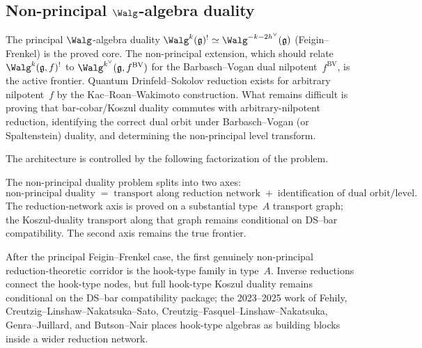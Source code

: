 \subsection{Non-principal \texorpdfstring{$\Walg$}{W}-algebra duality}
\label{subsec:non-principal-w-algebra-duality}

The principal $\Walg$-algebra duality
$\Walg^k(\mathfrak{g})^! \simeq
\Walg^{-k-2h^\vee}(\mathfrak{g})$
(Feigin--Frenkel) is the proved core. The non-principal extension,
which should relate $\Walg^k(\mathfrak{g}, f)^!$ to
$\Walg^{k^\vee}(\mathfrak{g}, f^{\mathrm{BV}})$ for the
Barbasch--Vogan dual nilpotent~$f^{\mathrm{BV}}$, is the active
frontier. Quantum Drinfeld--Sokolov reduction exists for arbitrary
nilpotent~$f$ by the Kac--Roan--Wakimoto construction. What remains
difficult is proving that bar-cobar/Koszul duality commutes with
arbitrary-nilpotent reduction, identifying the correct dual orbit
under Barbasch--Vogan (or Spaltenstein) duality, and determining the
non-principal level transform.

The architecture is controlled by the following factorization of the
problem.

\begin{remark}
\label{rem:transport-orbit-factorization}
The non-principal duality problem splits into two axes:
\[
\text{non-principal duality}
\;=\;
\text{transport along reduction network}
\;+\;
\text{identification of dual orbit/level}.
\]
The reduction-network axis is proved on a substantial type~$A$
transport graph; the Koszul-duality transport along that graph
remains conditional on DS--bar compatibility. The second axis
remains the true frontier.
\end{remark}

After the principal Feigin--Frenkel case, the first genuinely
non-principal reduction-theoretic corridor is the hook-type family in
type~$A$. Inverse reductions connect the hook-type nodes, but full
hook-type Koszul duality remains conditional on the DS--bar
compatibility package; the 2023--2025 work of Fehily,
Creutzig--Linshaw--Nakatsuka--Sato,
Creutzig--Fasquel--Linshaw--Nakatsuka, Genra--Juillard, and
Butson--Nair places hook-type algebras as building blocks inside
a wider reduction network.

